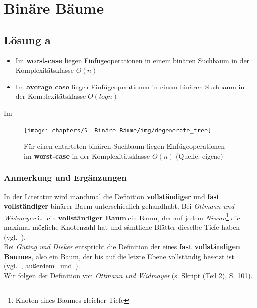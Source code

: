 \chapter{Binäre Bäume}

\section{Lösung a}

\begin{itemize}
    \item Im \textbf{worst-case} liegen Einfügeoperationen in einem binären Suchbaum in der Komplexitätsklasse $O(n)$
    \item Im \textbf{average-case} liegen Einfügeoperationen in einem binären Suchbaum in der Komplexitätsklasse $O(log n)$
\end{itemize}

Im \textbf{}


\begin{figure}
    \begin{center}
        \texttt{[image: chapters/5. Binäre Bäume/img/degenerate\_tree]}
        \caption{Für einen entarteten binären Suchbaum liegen Einfügeoperationen im \textbf{worst-case} in der Komplexitätsklasse $O(n)$ (Quelle: eigene)}
        \label{fig:degeneratetree}
    \end{center}
\end{figure}

\subsection{Anmerkung und Ergänzungen}


\noindent
In der Literatur wird manchmal die Definition \textbf{vollständiger} und \textbf{fast vollständiger} binärer Baum unterschiedlich gehandhabt.
Bei \textit{Ottmann und Widmayer} ist ein \textbf{vollständiger Baum} ein Baum, der auf jedem \textit{Niveau}\footnote{Knoten eines Baumes gleicher Tiefe} die maximal mögliche Knotenzahl hat und sämtliche Blätter dieselbe Tiefe haben (vgl.~\cite[261]{OW17e}).\\
Bei \textit{Güting und Dieker} entspricht die Definition der eines \textbf{fast vollständigen Baumes}, also ein Baum, der bis auf die letzte Ebene vollständig besetzt ist (vgl.~\cite[96]{GD18c}, außerdem~\cite[161]{CL22} und~\cite[401]{Knu97a}).\\
Wir folgen der Definition von \textit{Ottmann und Widmayer} (s. Skript (Teil 2), S.  101).\\


